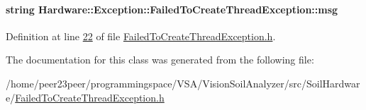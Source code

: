\paragraph[{msg}]{\setlength{\rightskip}{0pt plus 5cm}string Hardware\+::\+Exception\+::\+Failed\+To\+Create\+Thread\+Exception\+::msg\hspace{0.3cm}{\ttfamily [private]}}\label{class_hardware_1_1_exception_1_1_failed_to_create_thread_exception_a095cd7250c0a527623cf993c991572a8}


Definition at line \hyperlink{_failed_to_create_thread_exception_8h_source_l00022}{22} of file \hyperlink{_failed_to_create_thread_exception_8h_source}{Failed\+To\+Create\+Thread\+Exception.\+h}.



The documentation for this class was generated from the following file\+:\begin{DoxyCompactItemize}
\item 
/home/peer23peer/programmingspace/\+V\+S\+A/\+Vision\+Soil\+Analyzer/src/\+Soil\+Hardware/\hyperlink{_failed_to_create_thread_exception_8h}{Failed\+To\+Create\+Thread\+Exception.\+h}\end{DoxyCompactItemize}
